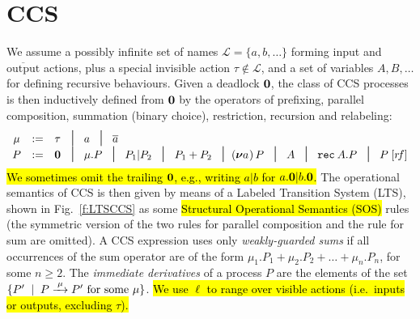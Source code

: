 
\section{CCS}
\label{ss:ccs}

We assume a possibly infinite set of names $\mathscr{L} = \{a, b,
\ldots\}$ forming input and $\overline{\mbox{output}}$ actions, plus a special invisible
action $\tau \notin \mathscr{L}$, and a set of variables $A, B,
\ldots$ for defining recursive behaviours.
Given a deadlock ${\boldsymbol 0}$, the class of CCS processes is then inductively defined from ${\boldsymbol 0}$ by the operators
of prefixing, parallel composition, summation (binary choice), restriction, recursion and relabeling:
\begin{equation*}
\begin{array}{cccl}
\mu  & := & \tau\!\!\!\! & \midd \; a  \; \midd \;  \outC a  \\
P  & := & \nil\!\!\!\! & \midd \;  \mu . P \; \midd \;  P_1 |  P_2 \; \midd  \;
P_1 + P_2 \; \midd %
  (\res a\!)\, P  \;  \midd \;  A \; \midd \; \recu A  P
\; \midd \; P\; [r\!f]  %
\end{array}
\end{equation*}
\hl{We sometimes omit the trailing ${\boldsymbol 0}$, e.g., writing $a|b$ for $a.{\boldsymbol 0} |b .{\boldsymbol 0}$.}
The operational semantics of CCS is then given by means of
a Labeled Transition System (LTS), shown in Fig.~\ref{f:LTSCCS} as
some \hl{Structural Operational Semantics (SOS)}
rules (the symmetric version of the two rules for
parallel composition and the rule for sum are omitted).
A CCS expression uses only \emph{weakly-guarded sums} if all occurrences of
the sum operator are of the form $\mu_1.P_1 + \mu_2.P_2 + \ldots
+ \mu_n.P_n$, for some $n \geq 2$.
 The \emph{immediate derivatives} of a
process $P$ are the elements of the set $\{P' \st P \arr\mu P' \mbox{
  for some $\mu$}\}$.
 \hl{We use $\ell$ to range over
  visible actions (i.e.~inputs or outputs, excluding  $\tau$).}
